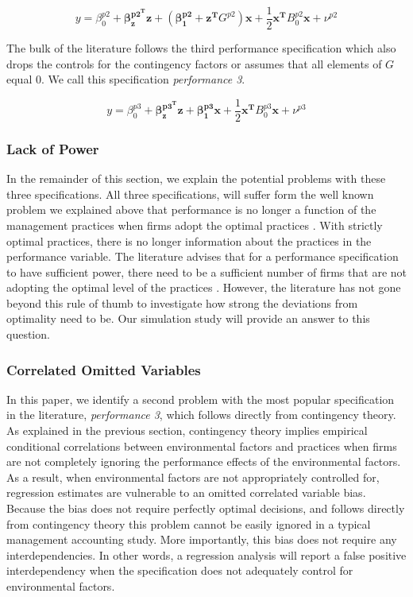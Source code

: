 \documentclass[12pt]{article}
\begin{document}
\begin{equation*}
    y = \beta_0^{p2} + \mathbf{\beta_z^{p2^T} z} + (\mathbf{\beta_1^{p2}} + \mathbf{z^T} G^{p2}) \mathbf{x} + 
    \frac{1}{2}\mathbf{x^T} B_0^{p2} \mathbf{x} + \nu^{p2}
\end{equation*}

The bulk of the literature follows the third performance specification which also drops the controls for the contingency factors or assumes that all elements of $G$ equal $0$. We call this specification \emph{performance 3}.

\begin{equation*}
    y = \beta_0^{p3} + \mathbf{\beta_z^{p3^T} z} + \mathbf{\beta_1^{p3}} \mathbf{x} + 
    \frac{1}{2}\mathbf{x^T} B_0^{p3} \mathbf{x} + \nu^{p3}
\end{equation*}

\subsubsection{Lack of Power}

In the remainder of this section, we explain the potential problems with these three specifications. All three specifications, will suffer form the well known problem we explained above that performance is no longer a function of the management practices when firms adopt the optimal practices \citep{Grabner2013}. With strictly optimal practices, there is no longer information about the practices in the performance variable. The literature advises that for a performance specification to have sufficient power, there need to be a sufficient number of firms that are not adopting the optimal level of the practices \citep{Bedford2016, Carree2011,  Hofmann2015OrganizationalChoices}. However, the literature has not gone beyond this rule of thumb to investigate how strong the deviations from optimality need to be. Our simulation study will provide an answer to this question.

\subsubsection{Correlated Omitted Variables}

In this paper, we identify a second problem with the most popular specification in the literature, \emph{performance 3}, which follows directly from contingency theory. As explained in the previous section, contingency theory implies empirical conditional correlations between environmental factors and practices when firms are not completely ignoring the performance effects of the environmental factors. As a result, when environmental factors are not appropriately controlled for, regression estimates are vulnerable to an omitted correlated variable bias. Because the bias does not require perfectly optimal decisions, and follows directly from contingency theory this problem cannot be easily ignored in a typical management accounting study. More importantly, this bias does not require any interdependencies. In other words, a regression analysis will report a false positive interdependency when the specification does not adequately control for environmental factors. 
\end{document}
